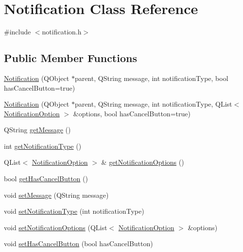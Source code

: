 \hypertarget{class_notification}{
\section{Notification Class Reference}
\label{class_notification}
}


{\ttfamily \#include $<$notification.h$>$}

\subsection*{Public Member Functions}
\begin{DoxyCompactItemize}
\item 
\hyperlink{class_notification_a2b79001967f10e6a573427b72e93d88f}{Notification} (QObject $\ast$parent, QString message, int notificationType, bool hasCancelButton=true)
\item 
\hyperlink{class_notification_a50c872b05a1c6b70c963143f3c526605}{Notification} (QObject $\ast$parent, QString message, int notificationType, QList$<$ \hyperlink{class_notification_option}{NotificationOption} $>$ \&options, bool hasCancelButton=true)
\item 
QString \hyperlink{class_notification_a8572346b3b6864c798d0c88c84a9488f}{getMessage} ()
\item 
int \hyperlink{class_notification_a01d1f04d52cb0b0849ad2f6fa2b398e0}{getNotificationType} ()
\item 
QList$<$ \hyperlink{class_notification_option}{NotificationOption} $>$ \& \hyperlink{class_notification_ae4e6c584005a90ec5c7a44b61a8f8811}{getNotificationOptions} ()
\item 
bool \hyperlink{class_notification_ade29a0210eeebe611d28fbe07fbd64f7}{getHasCancelButton} ()
\item 
void \hyperlink{class_notification_af1544d2ee3237b16863b777f2f119432}{setMessage} (QString message)
\item 
void \hyperlink{class_notification_aa22b660eeda29be0159c146c70d949bc}{setNotificationType} (int notificationType)
\item 
void \hyperlink{class_notification_a5f738c68e1af9cf2dfbe0784792911ba}{setNotificationOptions} (QList$<$ \hyperlink{class_notification_option}{NotificationOption} $>$ \&options)
\item 
void \hyperlink{class_notification_a8443cb2c8a05d93303cef75145352b4d}{setHasCancelButton} (bool hasCancelButton)
\end{DoxyCompactItemize}


